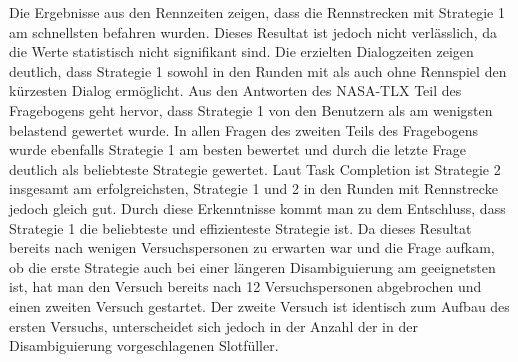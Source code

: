 \documentclass[12pt,a4paper]{scrartcl}
\begin{document}
Die Ergebnisse aus den Rennzeiten zeigen, dass die Rennstrecken mit Strategie 1 am schnellsten befahren wurden. Dieses Resultat ist jedoch nicht verlässlich, da die Werte statistisch nicht signifikant sind.
Die erzielten Dialogzeiten zeigen deutlich, dass Strategie 1 sowohl in den Runden mit als auch ohne Rennspiel den kürzesten Dialog ermöglicht. Aus den Antworten des NASA-TLX Teil des Fragebogens geht hervor, dass Strategie 1 von den Benutzern als am wenigsten belastend gewertet wurde.  In allen Fragen des zweiten Teils des Fragebogens wurde ebenfalls Strategie 1 am besten bewertet und durch die letzte Frage deutlich als beliebteste Strategie gewertet. Laut Task Completion ist Strategie 2 insgesamt am erfolgreichsten, Strategie 1 und 2 in den Runden mit Rennstrecke jedoch gleich gut.
Durch diese Erkenntnisse kommt man zu dem Entschluss, dass Strategie 1 die beliebteste und effizienteste Strategie ist. \newline \newline
Da dieses Resultat bereits nach wenigen Versuchspersonen zu erwarten war und die Frage aufkam, ob die erste Strategie auch bei einer längeren Disambiguierung am geeignetsten ist, hat man den Versuch bereits nach 12 Versuchspersonen abgebrochen und einen zweiten Versuch gestartet. Der zweite Versuch ist identisch zum Aufbau des ersten Versuchs, unterscheidet sich jedoch in der Anzahl der in der Disambiguierung vorgeschlagenen Slotfüller. 
\end{document}
